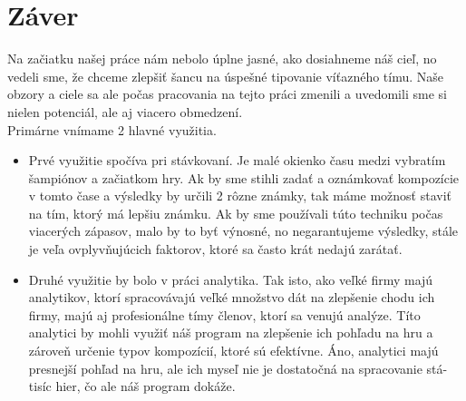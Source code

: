 \chapter{Záver}
\label{summary}
Na začiatku našej práce nám nebolo úplne jasné, ako dosiahneme náš cieľ, no vedeli sme, že chceme zlepšiť šancu na úspešné tipovanie víťazného tímu. Naše obzory a ciele sa ale počas pracovania na tejto práci zmenili a uvedomili sme si nielen potenciál, ale aj viacero obmedzení.
\\
Primárne vnímame 2 hlavné využitia. 
\begin{itemize}
	\item Prvé využitie spočíva pri stávkovaní. Je malé okienko času medzi vybratím šampiónov a začiatkom hry. Ak by sme stihli zadať a oznámkovať kompozície v tomto čase a výsledky by určili 2 rôzne známky, tak máme možnosť staviť na tím, ktorý má lepšiu známku. Ak by sme používali túto techniku počas viacerých zápasov, malo by to byť výnosné, no negarantujeme výsledky, stále je veľa ovplyvňujúcich faktorov, ktoré sa často krát nedajú zarátať.
	\item Druhé využitie by bolo v práci analytika. Tak isto, ako veľké firmy majú analytikov, ktorí spracovávajú veľké množstvo dát na zlepšenie chodu ich firmy, majú aj profesionálne tímy členov, ktorí sa venujú analýze. Títo analytici by mohli využiť náš program na zlepšenie ich pohľadu na hru a zároveň určenie typov kompozícií, ktoré sú efektívne. Áno, analytici majú presnejší pohľad na hru, ale ich myseľ nie je dostatočná na spracovanie stá-tisíc hier, čo ale náš program dokáže.
\end{itemize}


